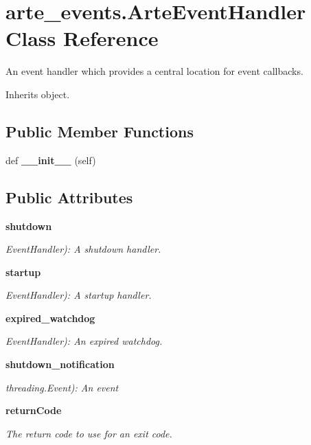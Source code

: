 \section{arte\+\_\+events.\+Arte\+Event\+Handler Class Reference}
\label{classarte__events_1_1_arte_event_handler}


An event handler which provides a central location for event callbacks.  




Inherits object.

\subsection*{Public Member Functions}
\begin{DoxyCompactItemize}
\item 
def {\bfseries \+\_\+\+\_\+init\+\_\+\+\_\+} (self)\label{classarte__events_1_1_arte_event_handler_af535e4b9e54118d42a007c8a94722b48}

\end{DoxyCompactItemize}
\subsection*{Public Attributes}
\begin{DoxyCompactItemize}
\item 
{\bf shutdown}
\begin{DoxyCompactList}\small\item\em Event\+Handler)\+: A shutdown handler. \end{DoxyCompactList}\item 
{\bf startup}
\begin{DoxyCompactList}\small\item\em Event\+Handler)\+: A startup handler. \end{DoxyCompactList}\item 
{\bf expired\+\_\+watchdog}\label{classarte__events_1_1_arte_event_handler_ae90e4f227876937bc6a4532e61cb3818}

\begin{DoxyCompactList}\small\item\em Event\+Handler)\+: An expired watchdog. \end{DoxyCompactList}\item 
{\bf shutdown\+\_\+notification}\label{classarte__events_1_1_arte_event_handler_a700abfec6c03df636eb76be12d92c2c1}

\begin{DoxyCompactList}\small\item\em threading.\+Event)\+: An event \end{DoxyCompactList}\item 
{\bf return\+Code}
\begin{DoxyCompactList}\small\item\em The return code to use for an exit code. \end{DoxyCompactList}\end{DoxyCompactItemize}


